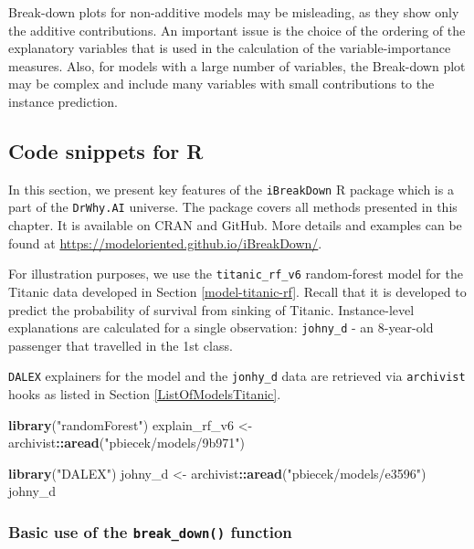 \documentclass[12pt,]{krantz}
\newenvironment{Shaded}{\begin{snugshade}}{\end{snugshade}}
\newcommand{\KeywordTok}[1]{\textcolor[rgb]{0.13,0.29,0.53}{\textbf{#1}}}
\newcommand{\NormalTok}[1]{#1}
\newcommand{\OperatorTok}[1]{\textcolor[rgb]{0.81,0.36,0.00}{\textbf{#1}}}
\newcommand{\StringTok}[1]{\textcolor[rgb]{0.31,0.60,0.02}{#1}}
\begin{document}
Break-down plots for non-additive models may be misleading, as they show only the additive contributions. An important issue is the choice of the ordering of the explanatory variables that is used in the calculation of the variable-importance measures. Also, for models with a large number of variables, the Break-down plot may be complex and include many variables with small contributions to the instance prediction.

\hypertarget{BDR}{%
\subsection{Code snippets for R}\label{BDR}}

In this section, we present key features of the \texttt{iBreakDown} R package \citep{iBreakDownRPackage} which is a part of the \texttt{DrWhy.AI} universe. The package covers all methods presented in this chapter. It is available on CRAN and GitHub. More details and examples can be found at \url{https://modeloriented.github.io/iBreakDown/}.

For illustration purposes, we use the \texttt{titanic\_rf\_v6} random-forest model for the Titanic data developed in Section \ref{model-titanic-rf}. Recall that it is developed to predict the probability of survival from sinking of Titanic. Instance-level explanations are calculated for a single observation: \texttt{johny\_d} - an 8-year-old passenger that travelled in the 1st class.

\texttt{DALEX} explainers for the model and the \texttt{jonhy\_d} data are retrieved via \texttt{archivist} hooks as listed in Section \ref{ListOfModelsTitanic}.

\begin{Shaded}
\begin{Highlighting}[]
\KeywordTok{library}\NormalTok{(}\StringTok{"randomForest"}\NormalTok{)}
\NormalTok{explain_rf_v6 <-}\StringTok{ }\NormalTok{archivist}\OperatorTok{::}\KeywordTok{aread}\NormalTok{(}\StringTok{"pbiecek/models/9b971"}\NormalTok{)}

\KeywordTok{library}\NormalTok{(}\StringTok{"DALEX"}\NormalTok{)}
\NormalTok{johny_d <-}\StringTok{ }\NormalTok{archivist}\OperatorTok{::}\KeywordTok{aread}\NormalTok{(}\StringTok{"pbiecek/models/e3596"}\NormalTok{)}
\NormalTok{johny_d}
\end{Highlighting}
\end{Shaded}

\hypertarget{basic-use-of-the-break_down-function}{%
\subsubsection{\texorpdfstring{Basic use of the \texttt{break\_down()} function}{Basic use of the break\_down() function}}\label{basic-use-of-the-break_down-function}}
\end{document}
